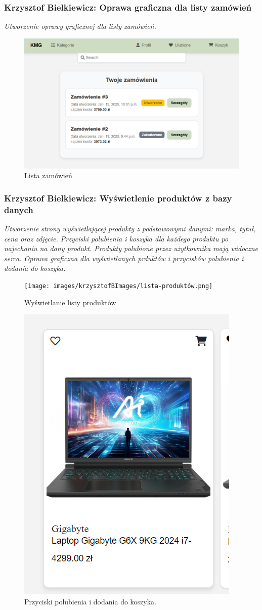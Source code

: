 \documentclass[12pt,a4paper,oneside]{article}
\theoremstyle{definition}
\numberwithin{equation}{section}
\begin{document}
\subsubsection{Krzysztof Bielkiewicz: Oprawa graficzna dla listy zamówień}
\label{1.3.12}
\textit{Utworzenie oprawy graficznej dla listy zamówień.}

\begin{figure}[H]
    \centering
    \includegraphics[width=0.8\columnwidth]{images/krzysztofBImages/orders.png}
    \caption{Lista zamówień}
\end{figure}


\subsubsection{Krzysztof Bielkiewicz: Wyświetlenie produktów z bazy danych}
\label{1.3.13}
\textit{Utworzenie strony wyświetlającej produkty z podstawowymi danymi: marka, tytuł, cena oraz zdjęcie.
Przyciski polubienia i koszyka dla każdego produktu po najechaniu na dany produkt.
Produkty polubione przez użytkownika mają widoczne serca.
Oprawa graficzna dla wyświetlanych prduktów i przycisków polubienia i dodania do koszyka.}
\begin{figure}[H]
    \centering
    \texttt{[image: images/krzysztofBImages/lista-produktów.png]}
    \caption{Wyświetlanie listy produktów}
\end{figure}

\begin{figure}[H]
    \centering
    \includegraphics[width=0.5\columnwidth]{images/krzysztofBImages/przyciski-polubienia-koszyka.png}
    \caption{Przyciski polubienia i dodania do koszyka.}
\end{figure}
\end{document}
